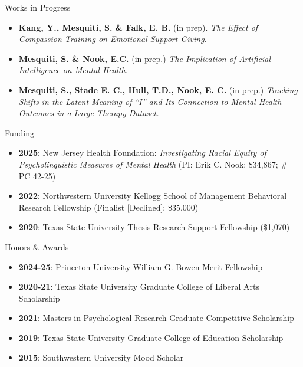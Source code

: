 \documentclass[
  11pt,
  ignorenonframetext,
]{beamer}
\providecommand{\tightlist}{%
  \setlength{\itemsep}{0pt}\setlength{\parskip}{0pt}}\usepackage{longtable,booktabs,array}
\begin{document}
\begin{frame}
\begin{block}{Works in Progress}
\label{works-in-progress}
\begin{itemize}
\tightlist
\item
  \textbf{Kang, Y., Mesquiti, S. \& Falk, E. B.} (in prep). \emph{The
  Effect of Compassion Training on Emotional Support Giving.}
\item
  \textbf{Mesquiti, S. \& Nook, E.C.} (in prep.) \emph{The Implication
  of Artificial Intelligence on Mental Health.}
\item
  \textbf{Mesquiti, S., Stade E. C., Hull, T.D., Nook, E. C.} (in prep.)
  \emph{Tracking Shifts in the Latent Meaning of ``I'' and Its
  Connection to Mental Health Outcomes in a Large Therapy Dataset.}
\end{itemize}
\end{block}
\end{frame}

\begin{frame}
\begin{block}{Funding}
\label{funding}
\begin{itemize}
\tightlist
\item
  \textbf{2025}: New Jersey Health Foundation: \emph{Investigating
  Racial Equity of Psycholinguistic Measures of Mental Health} (PI: Erik
  C. Nook; \$34,867; \# PC 42-25)
\item
  \textbf{2022}: Northwestern University Kellogg School of Management
  Behavioral Research Fellowship (Finalist {[}Declined{]}; \$35,000)
\item
  \textbf{2020}: Texas State University Thesis Research Support
  Fellowship (\$1,070)
\end{itemize}
\end{block}
\end{frame}

\begin{frame}
\begin{block}{Honors \& Awards}
\label{honors-awards}
\begin{itemize}
\tightlist
\item
  \textbf{2024-25}: Princeton University William G. Bowen Merit
  Fellowship
\item
  \textbf{2020-21}: Texas State University Graduate College of Liberal
  Arts Scholarship
\item
  \textbf{2021}: Masters in Psychological Research Graduate Competitive
  Scholarship
\item
  \textbf{2019}: Texas State University Graduate College of Education
  Scholarship
\item
  \textbf{2015}: Southwestern University Mood Scholar
\end{itemize}
\end{block}
\end{frame}
\end{document}
